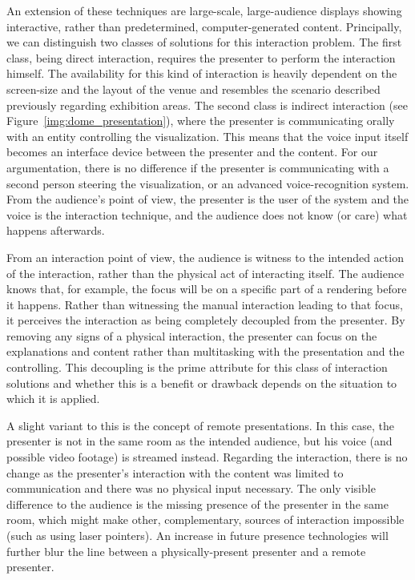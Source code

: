 \documentclass[review,journal]{vgtc}         %
\begin{document}
An extension of these techniques are large-scale, large-audience displays showing interactive, rather than predetermined, computer-generated content.
Principally, we can distinguish two classes of solutions for this interaction problem.
%
The first class, being direct interaction, requires the presenter to perform the interaction himself.
The availability for this kind of interaction is heavily dependent on the screen-size and the layout of the venue and resembles the scenario described previously regarding exhibition areas.
%
The second class is indirect interaction (see Figure~\ref{img:dome_presentation}), where the presenter is communicating orally with an entity controlling the visualization.
This means that the voice input itself becomes an interface device between the presenter and the content.
For our argumentation, there is no difference if the presenter is communicating with a second person steering the visualization, or an advanced voice-recognition system.
From the audience's point of view, the presenter is the user of the system and the voice is the interaction technique, and the audience does not know (or care) what happens afterwards.

From an interaction point of view, the audience is witness to the intended action of the interaction, rather than the physical act of interacting itself.
The audience knows that, for example, the focus will be on a specific part of a rendering before it happens.
Rather than witnessing the manual interaction leading to that focus, it perceives the interaction as being completely decoupled from the presenter.
By removing any signs of a physical interaction, the presenter can focus on the explanations and content rather than multitasking with the presentation and the controlling.
This decoupling is the prime attribute for this class of interaction solutions and whether this is a benefit or drawback depends on the situation to which it is applied.

A slight variant to this is the concept of remote presentations.
In this case, the presenter is not in the same room as the intended audience, but his voice (and possible video footage) is streamed instead.
Regarding the interaction, there is no change as the presenter's interaction with the content was limited to communication and there was no physical input necessary.
The only visible difference to the audience is the missing presence of the presenter in the same room, which might make other, complementary, sources of interaction impossible (such as using laser pointers).
An increase in future presence technologies will further blur the line between a physically-present presenter and a remote presenter.
\end{document}
